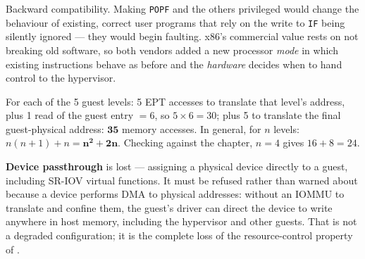 \begin{ans}
  \item Backward compatibility. Making \texttt{POPF} and the others privileged
        would change the behaviour of existing, correct user programs that rely
        on the write to \texttt{IF} being silently ignored --- they would begin
        faulting. x86's commercial value rests on not breaking old software, so
        both vendors added a new processor \emph{mode} in which existing
        instructions behave as before and the \emph{hardware} decides when to
        hand control to the hypervisor.
  \item For each of the 5 guest levels: 5 EPT accesses to translate that level's
        address, plus 1 read of the guest entry $= 6$, so $5 \times 6 = 30$;
        plus 5 to translate the final guest-physical address:
        $\mathbf{35}$ memory accesses. In general, for $n$ levels:
        $n(n+1) + n = \mathbf{n^2 + 2n}$. Checking against the chapter,
        $n = 4$ gives $16 + 8 = 24$.
  \item \textbf{Device passthrough} is lost --- assigning a physical device
        directly to a guest, including SR-IOV virtual functions. It must be
        refused rather than warned about because a device performs DMA to
        physical addresses: without an IOMMU to translate and confine them, the
        guest's driver can direct the device to write anywhere in host memory,
        including the hypervisor and other guests. That is not a degraded
        configuration; it is the complete loss of the resource-control property
        of .
\end{ans}

